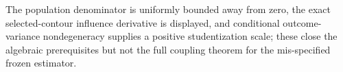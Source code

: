 The population denominator is uniformly bounded away from zero, the exact selected-contour influence derivative is displayed, and conditional outcome-variance nondegeneracy supplies a positive studentization scale; these close the algebraic prerequisites but not the full coupling theorem for the mis-specified frozen estimator.